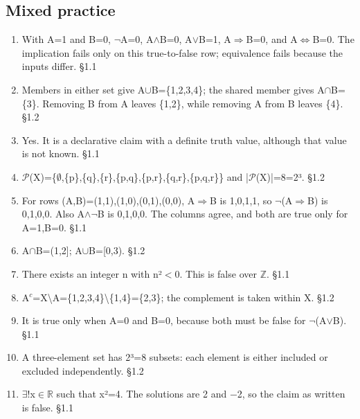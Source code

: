 \documentclass[11pt]{article}
\begin{document}
\begin{keepsection}\subsection{Mixed practice}

\begin{enumerate}
\item With A=1 and B=0, \ensuremath{\neg}A=0, A\ensuremath{\land}B=0, A\ensuremath{\lor}B=1, A\ensuremath{\Rightarrow}B=0, and A\ensuremath{\Leftrightarrow}B=0. The implication fails only on this true-to-false row; equivalence fails because the inputs differ. \hfill{\small\color{FAUblue}§1.1}
\item Members in either set give A\ensuremath{\cup}B=\{1,2,3,4\}; the shared member gives A\ensuremath{\cap}B=\{3\}. Removing B from A leaves \{1,2\}, while removing A from B leaves \{4\}. \hfill{\small\color{FAUblue}§1.2}
\item Yes. It is a declarative claim with a definite truth value, although that value is not known. \hfill{\small\color{FAUblue}§1.1}
\item \ensuremath{\mathcal{P}}(X)=\{\ensuremath{\emptyset},\{p\},\{q\},\{r\},\{p,q\},\{p,r\},\{q,r\},\{p,q,r\}\} and |\ensuremath{\mathcal{P}}(X)|=8=2³. \hfill{\small\color{FAUblue}§1.2}
\item For rows (A,B)=(1,1),(1,0),(0,1),(0,0), A\ensuremath{\Rightarrow}B is 1,0,1,1, so \ensuremath{\neg}(A\ensuremath{\Rightarrow}B) is 0,1,0,0. Also A\ensuremath{\land}\ensuremath{\neg}B is 0,1,0,0. The columns agree, and both are true only for A=1,B=0. \hfill{\small\color{FAUblue}§1.1}
\item A\ensuremath{\cap}B=(1,2]; A\ensuremath{\cup}B=[0,3). \hfill{\small\color{FAUblue}§1.2}
\item There exists an integer n with n²\ensuremath{<}0. This is false over \ensuremath{\mathbb{Z}}. \hfill{\small\color{FAUblue}§1.1}
\item A\ensuremath{^{c}}=X\textbackslash{}A=\{1,2,3,4\}\textbackslash{}\{1,4\}=\{2,3\}; the complement is taken within X. \hfill{\small\color{FAUblue}§1.2}
\item It is true only when A=0 and B=0, because both must be false for \ensuremath{\neg}(A\ensuremath{\lor}B). \hfill{\small\color{FAUblue}§1.1}
\item A three-element set has 2³=8 subsets: each element is either included or excluded independently. \hfill{\small\color{FAUblue}§1.2}
\item \ensuremath{\exists}!x\ensuremath{\in}\ensuremath{\mathbb{R}} such that x²=4. The solutions are 2 and \ensuremath{-}2, so the claim as written is false. \hfill{\small\color{FAUblue}§1.1}

\end{enumerate}
\end{keepsection}
\end{document}
